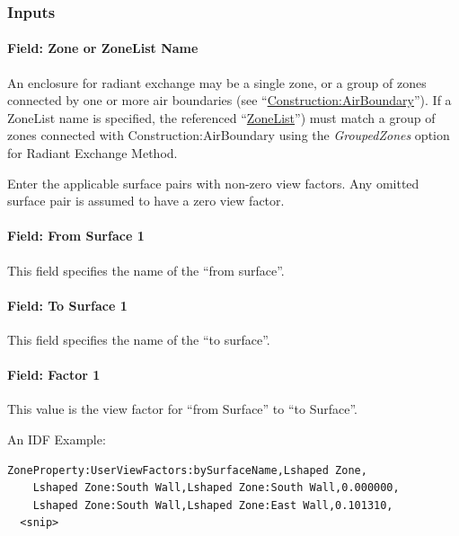 \subsubsection{Inputs}\label{inputs-17}

\paragraph{Field: Zone or ZoneList Name}\label{zonepropertyuserviewfactorsbysurfacename-field-zone-name}

An enclosure for radiant exchange may be a single zone, or a group of zones connected by one or more air boundaries (see ``\hyperref[constructionairboundary]{Construction:AirBoundary}''). If a ZoneList name is specified, the referenced ``\hyperref[zonelist]{ZoneList}'') must match a group of zones connected with Construction:AirBoundary using the \textit{GroupedZones} option for Radiant Exchange Method.

Enter the applicable surface pairs with non-zero view factors. Any omitted surface pair is assumed to have a zero view factor.

\paragraph{Field: From Surface 1}\label{field-from-surface-1}

This field specifies the name of the ``from surface''.

\paragraph{Field: To Surface 1}\label{field-to-surface-1}

This field specifies the name of the ``to surface''.

\paragraph{Field: Factor 1}\label{field-factor-1}

This value is the view factor for ``from Surface'' to ``to Surface''.

An IDF Example:

\begin{lstlisting}
ZoneProperty:UserViewFactors:bySurfaceName,Lshaped Zone,
    Lshaped Zone:South Wall,Lshaped Zone:South Wall,0.000000,
    Lshaped Zone:South Wall,Lshaped Zone:East Wall,0.101310,
  <snip>
\end{lstlisting}
